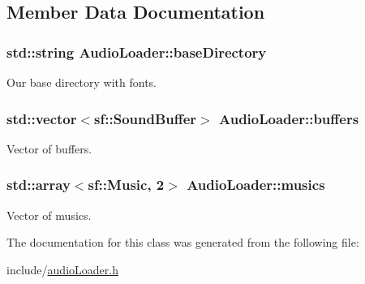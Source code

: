 \subsection{Member Data Documentation}
\subsubsection[{\texorpdfstring{base\+Directory}{baseDirectory}}]{\setlength{\rightskip}{0pt plus 5cm}std\+::string Audio\+Loader\+::base\+Directory\hspace{0.3cm}{\ttfamily [private]}}\hypertarget{class_audio_loader_ae6f0dc60b50135750cd8c311296affd3}{}\label{class_audio_loader_ae6f0dc60b50135750cd8c311296affd3}
Our base directory with fonts. 
\subsubsection[{\texorpdfstring{buffers}{buffers}}]{\setlength{\rightskip}{0pt plus 5cm}std\+::vector$<$sf\+::\+Sound\+Buffer$>$ Audio\+Loader\+::buffers\hspace{0.3cm}{\ttfamily [private]}}\hypertarget{class_audio_loader_a000dca4eff031478c1cb39c5d911a5ea}{}\label{class_audio_loader_a000dca4eff031478c1cb39c5d911a5ea}
Vector of buffers. 
\subsubsection[{\texorpdfstring{musics}{musics}}]{\setlength{\rightskip}{0pt plus 5cm}std\+::array$<$sf\+::\+Music, 2$>$ Audio\+Loader\+::musics\hspace{0.3cm}{\ttfamily [private]}}\hypertarget{class_audio_loader_a9e04f423490a0ba4a270751de5dc8226}{}\label{class_audio_loader_a9e04f423490a0ba4a270751de5dc8226}
Vector of musics. 

The documentation for this class was generated from the following file\+:\begin{DoxyCompactItemize}
\item 
include/\hyperlink{audio_loader_8h}{audio\+Loader.\+h}\end{DoxyCompactItemize}
